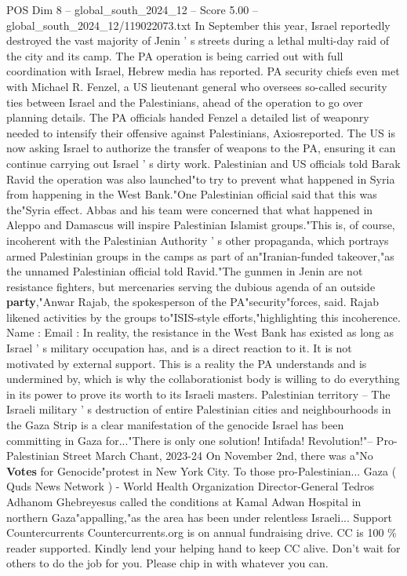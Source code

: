 \begin{textsample}{POS Dim 8 – global\_south\_2024\_12 – Score 5.00 – global\_south\_2024\_12/119022073.txt}
In September this year, Israel reportedly destroyed the vast majority of Jenin ' s streets during a lethal multi-day raid of the city and its camp.
The PA operation is being carried out with full coordination with Israel, Hebrew media has reported.
PA security chiefs even met with Michael R.
Fenzel, a US lieutenant general who oversees so-called security ties between Israel and the Palestinians, ahead of the operation to go over planning details.
The PA officials handed Fenzel a detailed list of weaponry needed to intensify their offensive against Palestinians, Axiosreported.
The US is now asking Israel to authorize the transfer of weapons to the PA, ensuring it can continue carrying out Israel ' s dirty work.
Palestinian and US officials told Barak Ravid the operation was also launched"to try to prevent what happened in Syria from happening in the West Bank."One Palestinian official said that this was the"Syria effect.
Abbas and his team were concerned that what happened in Aleppo and Damascus will inspire Palestinian Islamist groups."This is, of course, incoherent with the Palestinian Authority ' s other propaganda, which portrays armed Palestinian groups in the camps as part of an"Iranian-funded takeover,"as the unnamed Palestinian official told Ravid."The gunmen in Jenin are not resistance fighters, but mercenaries serving the dubious agenda of an outside \textbf{party},"Anwar Rajab, the spokesperson of the PA"security"forces, said.
Rajab likened activities by the groups to"ISIS-style efforts,"highlighting this incoherence.
Name : Email : In reality, the resistance in the West Bank has existed as long as Israel ' s military occupation has, and is a direct reaction to it.
It is not motivated by external support.
This is a reality the PA understands and is undermined by, which is why the collaborationist body is willing to do everything in its power to prove its worth to its Israeli masters.
Palestinian territory -- The Israeli military ' s destruction of entire Palestinian cities and neighbourhoods in the Gaza Strip is a clear manifestation of the genocide Israel has been committing in Gaza for..."There is only one solution!
Intifada!
Revolution!"-- Pro-Palestinian Street March Chant, 2023-24 On November 2nd, there was a"No \textbf{Votes} for Genocide"protest in New York City.
To those pro-Palestinian...
Gaza ( Quds News Network ) - World Health Organization Director-General Tedros Adhanom Ghebreyesus called the conditions at Kamal Adwan Hospital in northern Gaza"appalling,"as the area has been under relentless Israeli...
Support Countercurrents Countercurrents.org is on annual fundraising drive.
CC is 100 \% reader supported.
Kindly lend your helping hand to keep CC alive.
Don't wait for others to do the job for you.
Please chip in with whatever you can.

\end{textsample}
